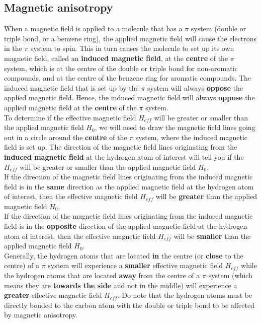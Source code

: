 \documentclass[11pt]{article}
\begin{document}
\newpage

\subsection{Magnetic anisotropy}
\label{sec:org3d851dc}
When a magnetic field is applied to a molecule that has a \(\pi\) system (double or triple bond, or a benzene ring), the applied magnetic field will cause the electrons in the \(\pi\) system to spin. This in turn causes the molecule to set up its own magnetic field, called an \textbf{induced magnetic field}, at the \textbf{centre} of the \(\pi\) system, which is at the centre of the double or triple bond for non-aromatic compounds, and at the centre of the benzene ring for aromatic compounds. The induced magnetic field that is set up by the \(\pi\) system will always \textbf{oppose} the applied magnetic field. Hence, the induced magnetic field will always \textbf{oppose} the applied magnetic field at the \textbf{centre} of the \(\pi\) system.
\\[0pt]

To determine if the effective magnetic field \(H_{eff}\) will be greater or smaller than the applied magnetic field \(H_{0}\), we will need to draw the magnetic field lines going out in a circle around the \textbf{centre} of the \(\pi\) system, where the induced magnetic field is set up. The direction of the magnetic field lines originating from the \textbf{induced magnetic field} at the hydrogen atom of interest will tell you if the \(H_{eff}\) will be greater or smaller than the applied magnetic field \(H_{0}\).
\\[0pt]

If the direction of the magnetic field lines originating from the induced magnetic field is in the \textbf{same} direction as the applied magnetic field at the hydrogen atom of interest, then the effective magnetic field \(H_{eff}\) will be \textbf{greater} than the applied magnetic field \(H_{0}\).
\\[0pt]

If the direction of the magnetic field lines originating from the induced magnetic field is in the \textbf{opposite} direction of the applied magnetic field at the hydrogen atom of interest, then the effective magnetic field \(H_{eff}\) will be \textbf{smaller} than the applied magnetic field \(H_{0}\).
\\[0pt]

Generally, the hydrogen atoms that are located \textbf{in} the centre (or \textbf{close} to the centre) of a \(\pi\) system will experience a \textbf{smaller} effective magnetic field \(H_{eff}\) while the hydrogen atoms that are located \textbf{away} from the centre of a \(\pi\) system (which means they are \textbf{towards the side} and not in the middle) will experience a \textbf{greater} effective magnetic field \(H_{eff}\). Do note that the hydrogen atoms must be directly bonded to the carbon atom with the double or triple bond to be affected by magnetic anisotropy.
\\[0pt]
\end{document}
